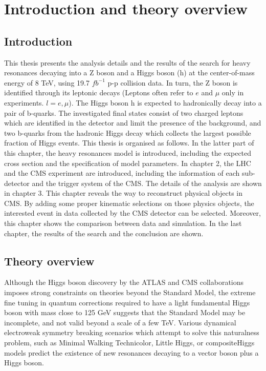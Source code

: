 \chapter{Introduction and theory overview}

\section{Introduction}
This thesis presents the analysis details and the results of the search for heavy resonances decaying into a Z boson and a Higgs boson (h) at the center-of-mass energy of 8 TeV, using 19.7 $fb^{-1}$ p-p collision data. In turn, the Z boson is identified through its leptonic decays (Leptons often refer to $e$ and $\mu$ only in experiments. $l = e, \mu$). The Higgs boson h is expected to hadronically decay into a pair of b-quarks. The investigated final states consist of two charged leptons which are identified in the detector and limit the presence of the background, and two b-quarks from the hadronic Higgs decay which collects the largest possible fraction of Higgs events.
\newline This thesis is organised as follows. In the latter part of this chapter, the heavy resonances model is introduced, including the expected cross section and the specification of model parameters. In chapter 2, the LHC and the CMS experiment are introduced, including the information of each sub-detector and the trigger system of the CMS. The details of the analysis are shown in chapter 3. This chapter reveals the way to reconstruct physical objects in CMS. By adding some proper kinematic selections on those physics objects, the interested event in data collected by the CMS detector can be selected. Moreover, this chapter shows the comparison between data and simulation. In the last chapter, the results of the search and the conclusion are shown.

\section{Theory overview}
Although the Higgs boson discovery by the ATLAS and CMS collaborations\cite{atlas-higgs-1,cms-higgs-1,cms-higgs-2} imposes strong constraints on theories beyond the Standard Model, the extreme fine tuning in quantum corrections required to have a light fundamental Higgs boson with mass close to 125 GeV\cite{cms-higgs-3,atlas-higgs-2,atlas-higgs-3,atlas-cms-higgs} suggests that the Standard Model may be incomplete, and not valid beyond a scale of a few TeV. Various dynamical electroweak symmetry breaking scenarios which attempt to solve this naturalness problem, such as Minimal Walking Technicolor\cite{technicolor}, Little Higgs\cite{little-higgs-1,little-higgs-2,little-higgs-3}, or compositeHiggs models\cite{compositehiggs-1,compositehiggs-2,compositehiggs-3} predict the existence of new resonances decaying to a vector boson plus a Higgs boson.

